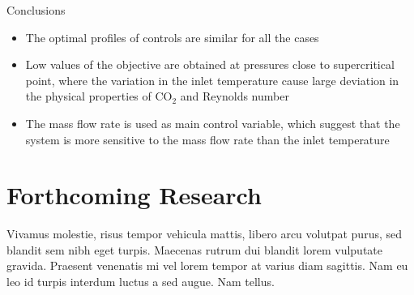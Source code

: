\documentclass[a0,portrait]{a0poster}
\begin{document}
\begin{multicols}{2}

\begin{tcolorbox}[width=\linewidth, boxrule=0mm, sharp corners=all, colback=white]
	{\LARGE Conclusions\\}

	\begin{itemize}
		\item The optimal profiles of controls are similar for all the cases
		\item Low values of the objective are obtained at pressures close to supercritical point, where the variation in the inlet temperature cause large deviation in the physical properties of CO$_2$ and Reynolds number
		\item The mass flow rate is used as main control variable, which suggest that the system is more sensitive to the mass flow rate than the inlet temperature
	\end{itemize}

\end{tcolorbox}


\section*{Forthcoming Research}

Vivamus molestie, risus tempor vehicula mattis, libero arcu volutpat purus, sed blandit sem nibh eget turpis. Maecenas rutrum dui blandit lorem vulputate gravida. Praesent venenatis mi vel lorem tempor at varius diam sagittis. Nam eu leo id turpis interdum luctus a sed augue. Nam tellus.


\nocite{*} %



\end{multicols}
\end{document}
